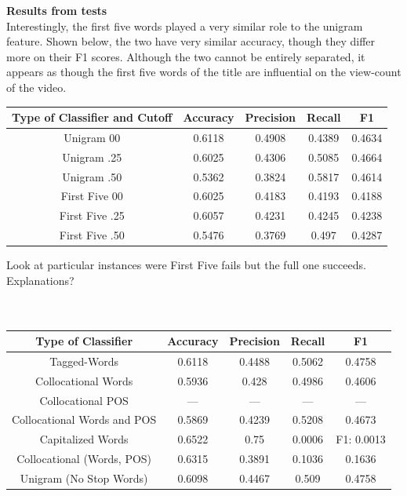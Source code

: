 \documentclass[a4paper,12pt]{article}
\begin{document}
\textbf{Results from tests}\\

Interestingly, the first five words played a very similar role to the unigram feature. Shown below, the two have very similar accuracy, though they differ more on their F1 scores. Although the two cannot be entirely separated, it appears as though the first five words of the title are influential on the view-count of the video. 

\begin{center}
 \begin{tabular}{|c| c| c| c| c|} 
 \hline
 Type of Classifier and Cutoff & Accuracy & Precision & Recall & F1 \\ [0.5ex] 
\hline
 Unigram 00 & 0.6118  & 0.4908  &0.4389  & 0.4634\\ 
 \hline
 {Unigram .25} &  0.6025& 0.4306  & 0.5085  & {0.4664}\\ 
\hline
 Unigram .50 & 0.5362  & 0.3824  & 0.5817  & 0.4614\\ 
\hline
  \hline

 \hline
 First Five 00 & 0.6025  & 0.4183  &0.4193  & 0.4188\\ 
 \hline
 {First Five .25} &  0.6057& 0.4231  & 0.4245  & {0.4238}\\ 
\hline
 First Five .50 & 0.5476  & 0.3769  & 0.497  & 0.4287\\ 
 \hline
\end{tabular}
\end{center}


Look at particular instances were First Five fails but the full one succeeds. Explanations?\\
\\
\\


\begin{center}
 \begin{tabular}{|c| c| c| c| c|} 
 \hline
 Type of Classifier & Accuracy & Precision & Recall & F1 \\ [0.5ex] 
\hline
 Tagged-Words  & 0.6118  & 0.4488  &0.5062  & 0.4758\\ 
 \hline
 Collocational Words & 0.5936  & 0.428  &0.4986  & 0.4606\\
 \hline
 Collocational POS & ---  & ---  &---  & ---\\
 \hline
Collocational Words and POS & 0.5869& 0.4239 & 0.5208& 0.4673\\
\hline
 Capitalized Words & 0.6522  & 0.75 & 0.0006 &F1: 0.0013\\
 \hline
 Collocational (Words, POS)& 0.6315 & 0.3891 & 0.1036 & 0.1636\\
 \hline
 Unigram (No Stop Words) & 0.6098 & 0.4467 &0.509& 0.4758\\
 \hline

\end{tabular}
\end{center}
\end{document}

